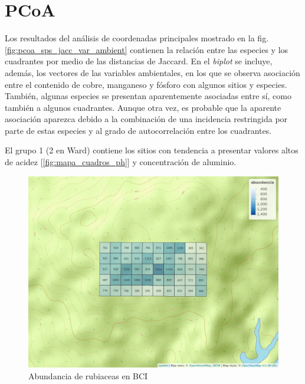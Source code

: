 \documentclass[11pt,]{article}
\begin{document}
\section{PCoA}\label{pcoa}

Los resultados del análisis de coordenadas principales mostrado en la
fig. \ref{fig:pcoa_sps_jacc_var_ambient} contienen la relación entre las
especies y los cuadrantes por medio de las distancias de Jaccard. En el
\emph{biplot} se incluye, además, los vectores de las variables
ambientales, en los que se observa asociación entre el contenido de
cobre, manganeso y fósforo con algunos sitios y especies. También,
algunas especies se presentan aparentemente asociadas entre sí, como
también a algunos cuadrantes. Aunque otra vez, es probable que la
aparente asociación aparezca debido a la combinación de una incidencia
restringida por parte de estas especies y al grado de autocorrelación
entre los cuadrantes.

El grupo 1 (2 en Ward) contiene los sitios con tendencia a presentar
valores altos de acidez {[}\ref{fig:mapa_cuadros_ph}{]} y concentración
de aluminio.

\begin{figure}
\centering
\includegraphics{mapa_cuadros_abun_rubic.png}
\caption{Abundancia de rubiaceas en BCI
\label{fig:mapa_cuadros_abun_rubic}}
\end{figure}
\end{document}
